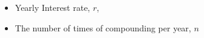 \documentclass[preview]{standalone}
\begin{document}
\begin{center}
\begin{itemize} \item Yearly Interest rate, $r$, \\ \item The number of times of compounding per year, $n$ \\ \end{itemize}
\end{center}
\end{document}
